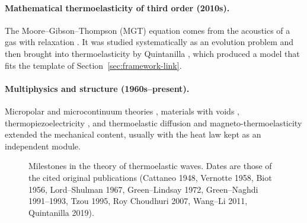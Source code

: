 \paragraph{Mathematical thermoelasticity of third order (2010s).} The Moore--Gibson--Thompson (MGT) equation comes from the acoustics of a gas with relaxation \citep{MooreGibson1960}. It was studied systematically as an evolution problem \citep{MarchandMcDevittTriggiani2012,LasieckaWang2015MGT,DellOroLasieckaPata2016MGT,DellOroPata2016Viscoelasticity} and then brought into thermoelasticity by Quintanilla \citep{Quintanilla2019,Bazarra2021MGTradial}, which produced a model that fits the template of Section~\ref{sec:framework-link}.

\paragraph{Multiphysics and structure (1960s--present).} Micropolar and microcontinuum theories \citep{Eringen1966a,TauchertClausAriman1968,Eringen1999}, materials with voids \citep{Nunziato1979,Cowin1983,Iesan1986}, thermopiezoelectricity \citep{Mindlin1974Thermopiezo,Nowacki1978,Chandrasekharaiah1984}, and thermoelastic diffusion and magneto-thermoelasticity extended the mechanical content, usually with the heat law kept as an independent module.

\begin{figure}[t]\centering
{}
\caption{Milestones in the theory of thermoelastic waves. Dates are those of the cited original publications (Cattaneo 1948, Vernotte 1958, Biot 1956, Lord--Shulman 1967, Green--Lindsay 1972, Green--Naghdi 1991--1993, Tzou 1995, Roy Choudhuri 2007, Wang--Li 2011, Quintanilla 2019).}\label{fig:timeline}
\end{figure}

